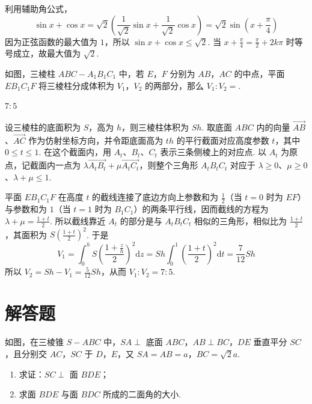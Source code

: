 \documentclass[UTF8,a4paper,oneside,11pt]{ctexbook}
\begin{document}
\begin{solution}
利用辅助角公式，
\[
\sin x+\cos x
=\sqrt{2}\left(\frac{1}{\sqrt{2}}\sin x+\frac{1}{\sqrt{2}}\cos x\right)
=\sqrt{2}\sin\left(x+\frac{\pi}{4}\right)
\]
因为正弦函数的最大值为 \(1\)，所以
\(\sin x+\cos x\leqslant\sqrt{2}\).
当 \(x+\frac{\pi}{4}=\frac{\pi}{2}+2k\pi\) 时等号成立，故最大值为 \(\sqrt{2}\).
\end{solution}

\begin{problem}
如图，三棱柱 \(ABC-A_1B_1C_1\) 中，若 \(E\)，\(F\) 分别为 \(AB\)，\(AC\) 的中点，平面 \(EB_1C_1F\) 将三棱柱分成体积为 \(V_1\)，\(V_2\) 的两部分，那么 \(V_1:V_2=\)\fillinblank{}.

\end{problem}

\begin{answer}
\(7:5\)
\end{answer}

\begin{solution}
设三棱柱的底面积为 \(S\)，高为 \(h\)，则三棱柱体积为 \(Sh\). 取底面 \(ABC\) 内的向量 \(\overrightarrow{AB}\)、\(\overrightarrow{AC}\) 作为仿射坐标方向，并令距底面高为 \(th\) 的平行截面对应高度参数 \(t\)，其中 \(0\leqslant t\leqslant1\). 在这个截面内，用 \(A_t\)、\(B_t\)、\(C_t\) 表示三条侧棱上的对应点. 以 \(A_t\) 为原点，记截面内一点为 \(\lambda\overrightarrow{A_tB_t}+\mu\overrightarrow{A_tC_t}\)，则整个三角形 \(A_tB_tC_t\) 对应于 \(\lambda\geqslant0\)、\(\mu\geqslant0\)、\(\lambda+\mu\leqslant1\).

平面 \(EB_1C_1F\) 在高度 \(t\) 的截线连接了底边方向上参数和为 \(\frac12\)（当 \(t=0\) 时为 \(EF\)）与参数和为 \(1\)（当 \(t=1\) 时为 \(B_1C_1\)）的两条平行线，因而截线的方程为 \(\lambda+\mu=\frac{1+t}{2}\). 所以截线靠近 \(A_t\) 的部分是与 \(A_tB_tC_t\) 相似的三角形，相似比为 \(\frac{1+t}{2}\)，其面积为 \(S\left(\frac{1+t}{2}\right)^2\). 于是
\[
V_1=\int_0^h S\left(\frac{1+\frac{z}{h}}{2}\right)^2\mathrm dz
=Sh\int_0^1\left(\frac{1+t}{2}\right)^2\mathrm dt
=\frac{7}{12}Sh
\]
所以 \(V_2=Sh-V_1=\frac{5}{12}Sh\)，从而 \(V_1:V_2=7:5\).
\end{solution}

\section{解答题}

\begin{problem}
如图，在三棱锥 \(S-ABC\) 中，\(SA\perp\) 底面 \(ABC\)，\(AB\perp BC\)，\(DE\) 垂直平分 \(SC\)，且分别交 \(AC\)，\(SC\) 于 \(D\)，\(E\)，又 \(SA=AB=a\)，\(BC=\sqrt{2}a\).
\begin{enumerate}
\item 求证：\(SC\perp\) 面 \(BDE\)；
\item 求面 \(BDE\) 与面 \(BDC\) 所成的二面角的大小.
\end{enumerate}

\end{problem}
\end{document}
